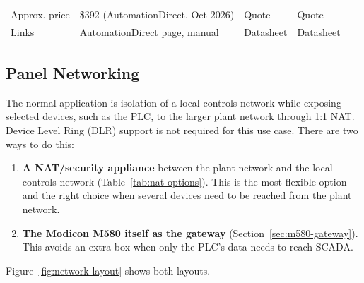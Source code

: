 \begin{small}
\begin{longtable}{@{}P{2.9cm}P{3.6cm}P{3.6cm}P{3.6cm}@{}}
Approx. price & \$392 (AutomationDirect, Oct 2026) & Quote & Quote \\
Links & \href{https://www.automationdirect.com/adc/shopping/catalog/communications/protocol_gateways/modbus_gateways/eki-1222-ce}{AutomationDirect page}, \href{https://cdn.automationdirect.com/static/manuals/advantechmbgateway/advmbgatewayum.pdf}{manual} & \href{https://cdn.logic-control.com/docs/red-lion/Datasheets/Data\%20Stations/DA10D_and_DA30D_Datasheet.pdf}{Datasheet} & \href{https://cdn.logic-control.com/docs/red-lion/Datasheets/Data\%20Stations/DA10D_and_DA30D_Datasheet.pdf}{Datasheet} \\
\bottomrule
\end{longtable}
\end{small}

\subsection{Panel Networking}
The normal application is isolation of a local controls network while exposing selected devices, such as the PLC, to the larger plant network through 1:1 NAT. Device Level Ring (DLR) support is not required for this use case. There are two ways to do this:
\begin{enumerate}[itemsep=2pt]
  \item \textbf{A NAT/security appliance} between the plant network and the local controls network (Table~\ref{tab:nat-options}). This is the most flexible option and the right choice when several devices need to be reached from the plant network.
  \item \textbf{The Modicon M580 itself as the gateway} (Section~\ref{sec:m580-gateway}). This avoids an extra box when only the PLC's data needs to reach SCADA.
\end{enumerate}
Figure~\ref{fig:network-layout} shows both layouts.

